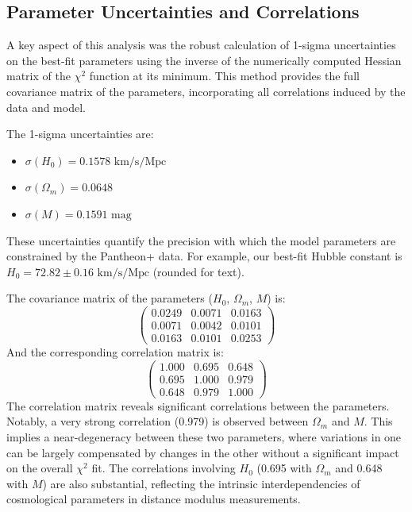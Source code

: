 \documentclass[aps,prl,twocolumn,groupedaddress]{revtex4-2}
\begin{document}
\subsection{Parameter Uncertainties and Correlations}
A key aspect of this analysis was the robust calculation of 1-sigma uncertainties on the best-fit parameters using the inverse of the numerically computed Hessian matrix of the $\chi^2$ function at its minimum. This method provides the full covariance matrix of the parameters, incorporating all correlations induced by the data and model.

The 1-sigma uncertainties are:
\begin{itemize}
    \item $\sigma(H_0) = 0.1578 \text{ km/s/Mpc}$
    \item $\sigma(\Omega_m) = 0.0648$
    \item $\sigma(M) = 0.1591 \text{ mag}$
\end{itemize}
These uncertainties quantify the precision with which the model parameters are constrained by the Pantheon+ data. For example, our best-fit Hubble constant is $H_0 = 72.82 \pm 0.16 \text{ km/s/Mpc}$ (rounded for text).

The covariance matrix of the parameters ($H_0$, $\Omega_m$, $M$) is:
\begin{equation*}
\begin{pmatrix}
0.0249 & 0.0071 & 0.0163 \\
0.0071 & 0.0042 & 0.0101 \\
0.0163 & 0.0101 & 0.0253
\end{pmatrix}
\end{equation*}
And the corresponding correlation matrix is:
\begin{equation*}
\begin{pmatrix}
1.000 & 0.695 & 0.648 \\
0.695 & 1.000 & 0.979 \\
0.648 & 0.979 & 1.000
\end{pmatrix}
\end{equation*}
The correlation matrix reveals significant correlations between the parameters. Notably, a very strong correlation (0.979) is observed between $\Omega_m$ and $M$. This implies a near-degeneracy between these two parameters, where variations in one can be largely compensated by changes in the other without a significant impact on the overall $\chi^2$ fit. The correlations involving $H_0$ (0.695 with $\Omega_m$ and 0.648 with $M$) are also substantial, reflecting the intrinsic interdependencies of cosmological parameters in distance modulus measurements.
\end{document}
